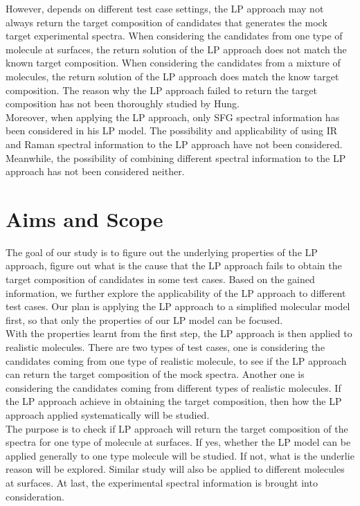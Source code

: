 However, depends on different test case settings, the LP approach may not always return the target composition of candidates that generates the mock target experimental spectra. When considering the candidates from one type of molecule at surfaces, the return solution of the LP approach does not match the known target composition. When considering the candidates from a mixture of molecules, the return solution of the LP approach does match the know target composition. The reason why the LP approach failed to return the target composition has not been thoroughly studied by Hung. \\

Moreover, when applying the LP approach, only SFG spectral information has been considered in his LP model. The possibility and applicability of using IR and Raman spectral information to the LP approach have not been considered. Meanwhile, the possibility of combining different spectral information to the LP approach has not been considered neither. \\
	
\section{Aims and Scope}
The goal of our study is to figure out the underlying properties of the LP approach, figure out what is the cause that the LP approach fails to obtain the target composition of candidates in some test cases. Based on the gained information, we further explore the applicability of the LP approach to different test cases. Our plan is applying the LP approach to a simplified molecular model first, so that only the properties of our LP model can be focused. \\

With the properties learnt from the first step, the LP approach is then applied to realistic molecules. There are two types of test cases, one is considering the candidates coming from one type of realistic molecule, to see if the LP approach can return the target composition of the mock spectra. Another one is considering the candidates coming from different types of realistic molecules. If the LP approach achieve in obtaining the target composition, then how the LP approach applied systematically will be studied. \\

The purpose is to check if LP approach will return the target composition of the spectra for one type of molecule at surfaces. If yes, whether the LP model can be applied generally to one type molecule will be studied. If not, what is the underlie reason will be explored. Similar study will also be applied to different molecules at surfaces. At last, the experimental spectral information is brought into consideration. \\

